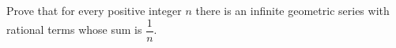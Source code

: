 Prove that for every positive integer $n$ there is an infinite geometric series with rational terms whose sum is $\dfrac{1}{n}$.
